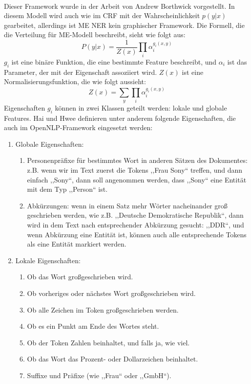 \paragraph{}
Dieser Framework wurde in der Arbeit von Andrew Borthwick\cite{Andrew:99} vorgestellt. In diesem Modell wird auch wie im CRF mit der Wahrscheinlichkeit $p(y|x)$ gearbeitet, allerdings ist ME NER kein graphischer Framework. Die Formell, die die Verteilung für ME-Modell beschreibt, sieht wie folgt aus:
$$
P(y|x) = \frac{1}{Z(x)}\prod_i \alpha_i^{g_i(x,y)}
$$
$g_i$ ist eine binäre Funktion, die eine bestimmte Feature beschreibt, und $\alpha_i$ ist das Parameter, der mit der Eigenschaft assoziiert wird. $Z(x)$ ist eine Normalisierungsfunktion, die wie folgt aussieht:
$$
Z(x) = \sum_y \prod_i \alpha_i^{g_i(x,y)}
$$
Eigenschaften $g_i$ können in zwei Klassen geteilt werden: lokale und globale Features. Hai und Hwee\cite{Hai/Hwee:02} definieren unter anderem folgende Eigenschaften, die auch im OpenNLP-Framework eingesetzt werden:
\begin{enumerate}
\item Globale Eigenschaften:
\begin{enumerate}
\item Personenpräfixe für bestimmtes Wort in anderen Sätzen des Dokumentes: z.B. wenn wir im Text zuerst die Tokens ,,Frau Sony`` treffen, und dann einfach ,,Sony``, dann soll angenommen werden, dass ,,Sony`` eine Entität mit dem Typ ,,Person`` ist.
\item Abkürzungen: wenn in einem Satz mehr Wörter nacheinander groß geschrieben werden, wie z.B. ,,Deutsche Demokratische Republik``, dann wird in dem Text nach entsprechender Abkürzung gesucht: ,,DDR``, und wenn Abkürzung eine Entität ist, können auch alle entsprechende Tokens als eine Entität markiert werden.
\end{enumerate}
\item Lokale Eigenschaften:
\begin{enumerate}
\item Ob das Wort großgeschrieben wird.
\item Ob vorheriges oder nächstes Wort großgeschrieben wird.
\item Ob alle Zeichen im Token großgeschrieben werden.
\item Ob es ein Punkt am Ende des Wortes steht.
\item Ob der Token Zahlen beinhaltet, und falls ja, wie viel.
\item Ob das Wort das Prozent- oder Dollarzeichen beinhaltet.
\item Suffixe und Präfixe (wie ,,Frau`` oder ,,GmbH``).
\end{enumerate}
\end{enumerate}

